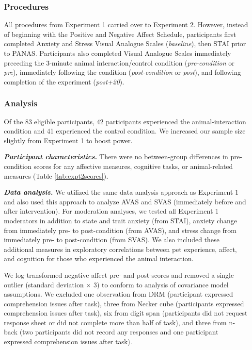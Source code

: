 \documentclass[
  english,
  pub,floatsintext]{apa6}
\begin{document}
\hypertarget{procedures-1}{%
\subsubsection{Procedures}\label{procedures-1}}

All procedures from Experiment 1 carried over to Experiment 2. However, instead of beginning with the Positive and Negative Affect Schedule, participants first completed Anxiety and Stress Visual Analogue Scales (\emph{baseline}), then STAI prior to PANAS. Participants also completed Visual Analogue Scales immediately preceding the 3-minute animal interaction/control condition (\emph{pre-condition} or \emph{pre}), immediately following the condition (\emph{post-condition} or \emph{post}), and following completion of the experiment (\emph{post+20}).

\hypertarget{analysis-1}{%
\subsubsection{Analysis}\label{analysis-1}}

Of the 83 eligible participants, 42 participants experienced the animal-interaction condition and 41 experienced the control condition. We increased our sample size slightly from Experiment 1 to boost power.

\textbf{\emph{Participant characteristics.}}
There were no between-group differences in pre-condition scores for any affective measures, cognitive tasks, or animal-related measures (Table \ref{tab:expt2scores}).

\textbf{\emph{Data analysis.}}
We utilized the same data analysis approach as Experiment 1 and also used this approach to analyze AVAS and SVAS (immediately before and after intervention). For moderation analyses, we tested all Experiment 1 moderators in addition to state and trait anxiety (from STAI), anxiety change from immediately pre- to post-condition (from AVAS), and stress change from immediately pre- to post-condition (from SVAS). We also included these additional measures in exploratory correlations between pet experience, affect, and cognition for those who experienced the animal interaction.

We log-transformed negative affect pre- and post-scores and removed a single outlier (standard deviation \(\times\) 3) to conform to analysis of covariance model assumptions. We excluded one observation from DRM (participant expressed comprehension issues after task), three from Necker cube (participants expressed comprehension issues after task), six from digit span (participants did not request response sheet or did not complete more than half of task), and three from n-back (two participants did not record any responses and one participant expressed comprehension issues after task).
\end{document}
